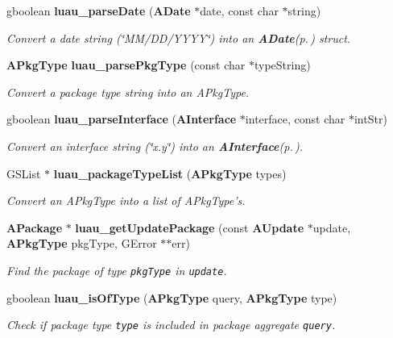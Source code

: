 \begin{CompactItemize}
gboolean {\bf luau\_\-parse\-Date} ({\bf ADate} $\ast$date, const char $\ast$string)
\begin{CompactList}\small\item\em Convert a date string (\char`\"{}MM/DD/YYYY\char`\"{}) into an {\bf ADate}{\rm (p.\,\pageref{structADate})} struct. \item\end{CompactList}\item 
{\bf APkg\-Type} {\bf luau\_\-parse\-Pkg\-Type} (const char $\ast$type\-String)
\begin{CompactList}\small\item\em Convert a package type string into an APkg\-Type. \item\end{CompactList}\item 
gboolean {\bf luau\_\-parse\-Interface} ({\bf AInterface} $\ast$interface, const char $\ast$int\-Str)
\begin{CompactList}\small\item\em Convert an interface string (\char`\"{}x.y\char`\"{}) into an {\bf AInterface}{\rm (p.\,\pageref{structAInterface})}. \item\end{CompactList}\item 
GSList $\ast$ {\bf luau\_\-package\-Type\-List} ({\bf APkg\-Type} types)
\begin{CompactList}\small\item\em Convert an APkg\-Type into a list of APkg\-Type's. \item\end{CompactList}\item 
{\bf APackage} $\ast$ {\bf luau\_\-get\-Update\-Package} (const {\bf AUpdate} $\ast$update, {\bf APkg\-Type} pkg\-Type, GError $\ast$$\ast$err)
\begin{CompactList}\small\item\em Find the package of type {\tt pkg\-Type} in {\tt update}. \item\end{CompactList}\item 
gboolean {\bf luau\_\-is\-Of\-Type} ({\bf APkg\-Type} query, {\bf APkg\-Type} type)
\begin{CompactList}\small\item\em Check if package type {\tt type} is included in package aggregate {\tt query}. \item\end{CompactList}\item 
$$
\end{CompactItemize}
